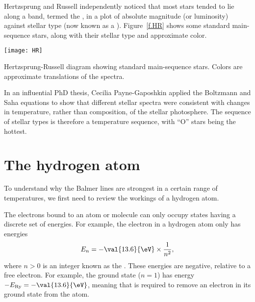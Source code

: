 Hertzsprung and Russell independently noticed that most stars tended to lie along a band, termed the , in a plot of absolute magnitude (or luminosity) against stellar type (now known as a ). Figure~\ref{f.HR} shows some standard main-sequence stars, along with their stellar type and approximate color.
\begin{marginfigure}
\texttt{[image: HR]}
\caption[Hertzsprung-Russell diagram of standard main-sequence stars]{\label{f.HR} Hertzsprung-Russell diagram showing standard main-sequence stars. Colors are approximate translations of the spectra.}
\end{marginfigure}

In an influential PhD thesis, Cecilia Payne-Gaposhkin\cite{Payne1925Stellar-Atmosph} applied the Boltzmann and Saha equations to show that different stellar spectra were consistent with changes in temperature, rather than composition, of the stellar photosphere. The sequence of stellar types is therefore a temperature sequence, with ``O'' stars being the hottest. 

\section{The hydrogen atom}

To understand why the Balmer lines are strongest in a certain range of temperatures, we first need to review the workings of a hydrogen atom.

The electrons bound to an atom or molecule can only occupy states having a discrete set of energies. For example, the electron in a hydrogen atom only has energies
\begin{equation}\label{e.H-levels}
        E_{n} = -\val{13.6}{\eV}\times \frac{1}{n^{2}},
\end{equation}
where $n > 0$ is an integer known as the .  These energies are negative, relative to a free electron.  For example, the ground state ($n=1$) has energy $-\ERy = -\val{13.6}{\eV}$, meaning that  is required to remove an electron in its ground state from the atom.

